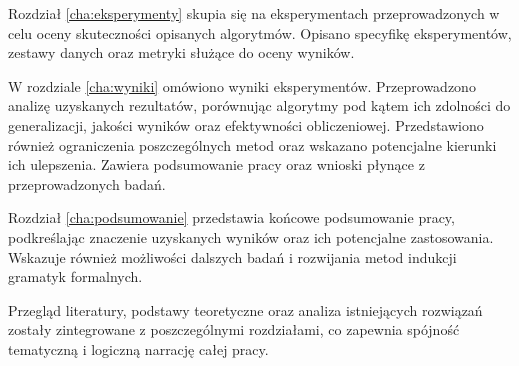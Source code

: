 Rozdział \ref{cha:eksperymenty} skupia się na eksperymentach przeprowadzonych w celu oceny skuteczności opisanych algorytmów. Opisano specyfikę eksperymentów, zestawy danych oraz metryki służące do oceny wyników.

W rozdziale \ref{cha:wyniki} omówiono wyniki eksperymentów. Przeprowadzono analizę uzyskanych rezultatów, porównując algorytmy pod kątem ich zdolności do generalizacji, jakości wyników oraz efektywności obliczeniowej. Przedstawiono również ograniczenia poszczególnych metod oraz wskazano potencjalne kierunki ich ulepszenia. Zawiera podsumowanie pracy oraz wnioski płynące z przeprowadzonych badań.

Rozdział \ref{cha:podsumowanie} przedstawia końcowe podsumowanie pracy, podkreślając znaczenie uzyskanych wyników oraz ich potencjalne zastosowania. Wskazuje również możliwości dalszych badań i rozwijania metod indukcji gramatyk formalnych.

Przegląd literatury, podstawy teoretyczne oraz analiza istniejących rozwiązań zostały zintegrowane z poszczególnymi rozdziałami, co zapewnia spójność tematyczną i logiczną narrację całej pracy.

